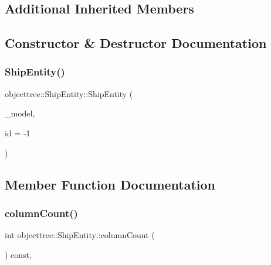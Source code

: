 \subsection*{Additional Inherited Members}


\subsection{Constructor \& Destructor Documentation}
\mbox{\label{classobjecttree_1_1_ship_entity_afb4b92fd6641d4ee6010d59c5bfec957}} 
\subsubsection{\texorpdfstring{ShipEntity()}{ShipEntity()}}
{\footnotesize\ttfamily objecttree\+::\+Ship\+Entity\+::\+Ship\+Entity (\begin{DoxyParamCaption}\item[{\mbox{\hyperlink{class_object_tree_model}{Object\+Tree\+Model}} $\ast$}]{\+\_\+model,  }\item[{int}]{id = {\ttfamily -\/1} }\end{DoxyParamCaption})}



\subsection{Member Function Documentation}
\mbox{\label{classobjecttree_1_1_ship_entity_a54b5e8e43ee06d70ab23b23c5a648aa8}} 
\subsubsection{\texorpdfstring{columnCount()}{columnCount()}}
{\footnotesize\ttfamily int objecttree\+::\+Ship\+Entity\+::column\+Count (\begin{DoxyParamCaption}{ }\end{DoxyParamCaption}) const\hspace{0.3cm}{\ttfamily [override]}, {\ttfamily [virtual]}}



